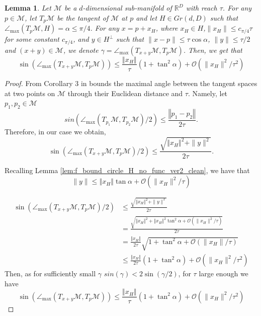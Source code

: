 \documentclass[12pt]{article}
\newtheorem{Lemma}[Theorem]{Lemma}
\theoremstyle{remark}
\newcommand{\RR}{\mathbb{R}}
\newcommand{\MM}{\mathcal{M}}
\newcommand{\OO}{\mathcal{O}}
\newcommand{\norm}[1]{\left\Vert #1 \right\Vert}
\newcommand{\maxangle}{\angle_{\max}}
\begin{document}
\begin{appendices}
\begin{Lemma}\label{lem:alpha-beta_x_no_func}
	Let $\MM$ be a $d$-dimensional sub-manifold of $\RR^D$ with reach $\tau$. For any $p \in \MM$, let $T_{p}\MM$ be the tangent of $\MM$ at $p$ and let $ H\in Gr(d, D) $ such that $ \maxangle(T_p\MM, H) = \alpha\leq \pi/4 $.
	For any $x = p + x_H$, where $x_H\in H$,$\|x_H\|\leq c_{\pi/4}\tau$ for some constant $c_{\pi/4}$, and $y\in H^\perp$  such that $\|x-p\|\leq \tau \cos \alpha$, $\|y\| \leq \tau/2$ and $(x + y)\in \MM$, we denote $ \gamma = \maxangle(T_{x+y}\MM, T_{p}\MM) $.
	Then, we get that
	\[
	\sin(\maxangle (T_{x+y}\MM, T_{p}\MM)) \leq \frac{\norm{x_H}}{\tau}(1 + \tan^2 \alpha)  +\OO(\|x_H\|^2/\tau^2)
	\]
\end{Lemma}
\begin{proof}
From  Corollary 3 in \cite{boissonnat2017reach} bounds the maximal angle between the tangent spaces at two points on $\MM$ through their Euclidean distance and $\tau$.
	Namely, let $p_1, p_2 \in \MM$
	\[
	sin(\maxangle(T_{p_1}\MM, T_{p_2}\MM)/2) \leq\frac{\norm{p_1 - p_2}}{2\tau}
	.\]
	Therefore, in our case we obtain,
	\begin{equation}\label{eq:sin_alpha_1}
	\sin(\maxangle (T_{x+y}\MM, T_{p}\MM)/2) \leq \frac{\sqrt{\norm{x_H}^2 + \|y\|^2}}{2\tau}
	.\end{equation}
		
	Recalling Lemma \ref{lem:f_bound_circle_H_no_func_ver2_clean}, we have that 
	\begin{equation*}
	\|y\| \leq \norm{x_H}\tan \alpha  +\OO(\|x_H\|^2/\tau)
	\end{equation*}
	
	\begin{align*}
	\sin(\maxangle (T_{x+y}\MM, T_{p}\MM)/2) &\leq \frac{\sqrt{\norm{x_H}^2 + \|y\|^2}}{2\tau}    \\
	&= \frac{\sqrt{\norm{x_H}^2 +  \norm{x_H}^2\tan^2 \alpha  +\OO(\|x_H\|^2/\tau)}}{2\tau}\\
	&=\frac{\norm{x_H}}{2\tau}\sqrt{1 + \tan^2 \alpha  +\OO(\|x_H\|/\tau)}\\
	&\leq\frac{\norm{x_H}}{2\tau}(1 + \tan^2 \alpha)  +\OO(\|x_H\|^2/\tau^2)
	\end{align*}
	Then, as for sufficiently small $\gamma$ $sin(\gamma) < 2\sin(\gamma/2)$, for $\tau$ large enough we have
	\[
	\sin(\maxangle (T_{x+y}\MM, T_{p}\MM)) \leq \frac{\norm{x_H}}{\tau}(1 + \tan^2 \alpha)  +\OO(\|x_H\|^2/\tau^2)
	\]
\end{proof}


\end{appendices}
\end{document}
